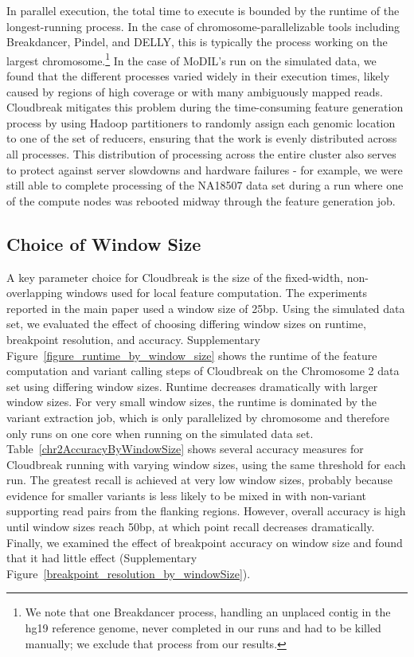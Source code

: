 \documentclass[11pt]{article}
\begin{document}
In parallel execution, the total time to execute is bounded by the runtime of the longest-running process. In the case of chromosome-parallelizable tools including Breakdancer, Pindel, and DELLY, this is typically the process working on the largest chromosome.\footnote{We note that one Breakdancer process, handling an unplaced contig in the hg19 reference genome, never completed in our runs and had to be killed manually; we exclude that process from our results.} In the case of MoDIL's run on the simulated data, we found that the different processes varied widely in their execution times, likely caused by regions of high coverage or with many ambiguously mapped reads. Cloudbreak mitigates this problem during the time-consuming feature generation process by using Hadoop partitioners to randomly assign each genomic location to one of the set of reducers, ensuring that the work is evenly distributed across all processes. This distribution of processing across the entire cluster also serves to protect against server slowdowns and hardware failures - for example, we were still able to complete processing of the NA18507 data set during a run where one of the compute nodes was rebooted midway through the feature generation job.

\subsection{Choice of Window Size}\label{section_window_size}

A key parameter choice for Cloudbreak is the size of the fixed-width, non-overlapping windows used for local feature computation. The experiments reported in the main paper used a window size of 25bp. Using the simulated data set, we evaluated the effect of choosing differing window sizes on runtime, breakpoint resolution, and accuracy. Supplementary Figure~\ref{figure_runtime_by_window_size} shows the runtime of the feature computation and variant calling steps of Cloudbreak on the Chromosome 2 data set using differing window sizes. Runtime decreases dramatically with larger window sizes. For very small window sizes, the runtime is dominated by the variant extraction job, which is only parallelized by chromosome and therefore only runs on one core when running on the simulated data set. Table~\ref{chr2AccuracyByWindowSize} shows several accuracy measures for Cloudbreak running with varying window sizes, using the same threshold for each run. The greatest recall is achieved at very low window sizes, probably because evidence for smaller variants is less likely to be mixed in with non-variant supporting read pairs from the flanking regions. However, overall accuracy is high until window sizes reach 50bp, at which point recall decreases dramatically. Finally, we examined the effect of breakpoint accuracy on window size and found that it had little effect (Supplementary Figure~\ref{breakpoint_resolution_by_windowSize}).
\end{document}
